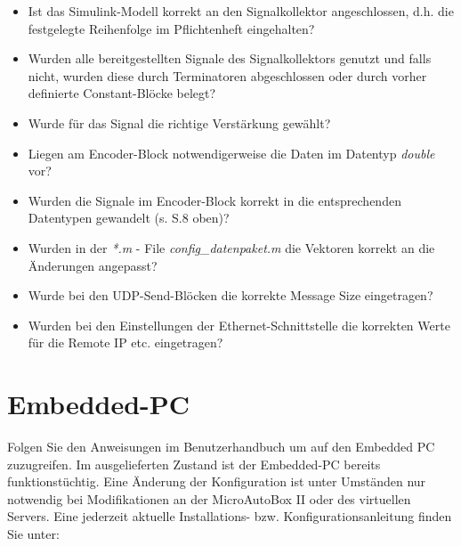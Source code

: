 \documentclass[fontsize = 12pt, paper = a4]{scrreprt}
\begin{document}
\begin{itemize}

\item Ist das Simulink-Modell korrekt an den Signalkollektor angeschlossen, d.h. die festgelegte Reihenfolge im Pflichtenheft eingehalten?

\item Wurden alle bereitgestellten Signale des Signalkollektors genutzt und falls nicht, wurden diese durch Terminatoren abgeschlossen oder durch vorher definierte Constant-Blöcke belegt?

\item Wurde für das Signal die richtige Verstärkung gewählt?

\item Liegen am Encoder-Block notwendigerweise die Daten im Datentyp \textit{double} vor?

\item Wurden die Signale im Encoder-Block korrekt in die entsprechenden Datentypen gewandelt (s. S.8 oben)?

\item Wurden in der \textit{*.m} - File \textit{config\_datenpaket.m} die Vektoren korrekt an die Änderungen angepasst?

\item Wurde bei den UDP-Send-Blöcken die korrekte Message Size eingetragen?

\item Wurden bei den Einstellungen der Ethernet-Schnittstelle die korrekten Werte für die Remote IP etc. eingetragen?

\end{itemize}

\newpage


\section{Embedded-PC}

Folgen Sie den Anweisungen im Benutzerhandbuch  um auf den Embedded PC zuzugreifen. Im ausgelieferten Zustand ist der Embedded-PC bereits funktionstüchtig. Eine Änderung der Konfiguration ist unter Umständen nur notwendig bei Modifikationen an der MicroAutoBox II oder des virtuellen Servers. Eine jederzeit aktuelle Installations- bzw. Konfigurationsanleitung finden Sie unter:

\vspace*{4mm}
\end{document}
